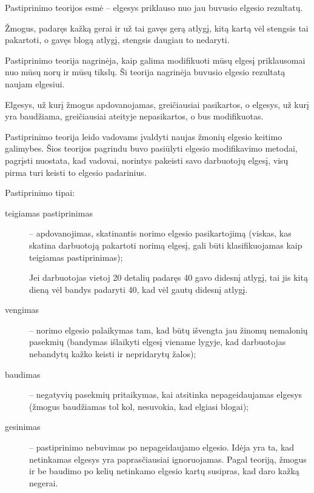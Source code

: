 Pastiprinimo teorijos esmė – elgesys priklauso nuo jau buvusio elgesio
rezultatų.

\begin{exmp}
  Žmogus, padaręs kažką gerai ir už tai gavęs gerą atlygį, kitą kartą
  vėl stengsis tai pakartoti, o gavęs blogą atlygį, stengsis daugiau
  to nedaryti.
\end{exmp}

Pastiprinimo teorija nagrinėja, kaip galima modifikuoti mūsų elgesį
priklausomai nuo mūsų norų ir mūsų tikslų. Ši teorija nagrinėja
buvusio elgesio rezultatą naujam elgesiui.

Elgesys, už kurį žmogus apdovanojamas, greičiausiai pasikartos, o
elgesys, už kurį yra baudžiama, greičiausiai ateityje nepasikartos,
o bus modifikuotas.

Pastiprinimo teorija leido vadovams įvaldyti naujas žmonių elgesio
keitimo galimybes. Šios teorijos pagrindu buvo pasiūlyti elgesio
modifikavimo metodai, pagrįsti nuostata, kad vadovai, norintys
pakeisti savo darbuotojų elgesį, visų pirma turi keisti to elgesio
padarinius.

Pastiprinimo tipai:
\begin{description}
  \item[teigiamas pastiprinimas] – apdovanojimas, skatinantis norimo
    elgesio pasikartojimą (viskas, kas skatina darbuotoją pakartoti norimą
    elgesį, gali būti klasifikuojamas kaip teigiamas pastiprinimas);
    \begin{exmp}
      Jei darbuotojas vietoj 20 detalių padaręs 40 gavo didesnį atlygį,
      tai jis kitą dieną vėl bandys padaryti 40, kad vėl gautų didesnį
      atlygį.
    \end{exmp}
  \item[vengimas] – norimo elgesio palaikymas tam, kad būtų išvengta
    jau žinomų nemalonių pasekmių (bandymas išlaikyti elgesį viename
    lygyje, kad darbuotojas nebandytų kažko keisti ir nepridarytų žalos);
  \item[baudimas] – negatyvių pasekmių pritaikymas, kai atsitinka
    nepageidaujamas elgesys (žmogus baudžiamas tol kol, nesuvokia, kad
    elgiasi blogai);
  \item[gesinimas] – pastiprinimo nebuvimas po nepageidaujamo elgesio.
    Idėja yra ta, kad netinkamas elgesys yra paprasčiausiai ignoruojamas.
    Pagal teoriją, žmogus ir be baudimo po kelių netinkamo elgesio kartų
    susipras, kad daro kažką negerai.
\end{description}
